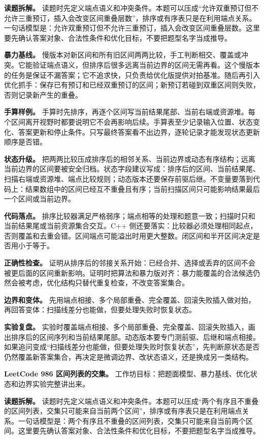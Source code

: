 \textbf{读题拆解。} 读题时先定义端点语义和冲突条件。本题可以压成“允许双重预订但不允许三重预订，插入会改变区间重叠层数”，排序或有序表只是在利用端点关系。一句话模型是：允许双重预订但不允许三重预订，插入会改变区间重叠层数。这里要先确认答案对象、合法性条件和优化目标，不要把题型名字当成推导。

\textbf{暴力基线。} 慢版本对新区间和所有旧区间两两比较，手工判断相交、覆盖或冲突。它能验证端点语义，但排序后很多远离当前边界的区间无需再看。这个慢版本的任务是保证不漏答案；它不追求快，只负责给优化版提供对拍基准。随后再引入优化抓手：保存已有预订和已经双重预订的区间；新预订若碰到双重区间则失败，否则记录新产生的重叠。

\textbf{手算样例。} 手算时先排序，再逐个区间写当前结果尾部、当前右端或资源堆。每个区间离开视野时都要说明它不会再影响后续。手算表至少记录输入位置、状态变化、答案更新和停止条件。只写最终答案看不出边界，逐轮记录才能发现状态更新顺序是否错。

\textbf{状态升级。} 把两两比较压成排序后的相邻关系、当前边界或动态有序结构；远离当前边界的区间要被安全归档。状态字段建议写成：排序后的区间、当前结果尾、扫描右端或资源堆、端点比较规则；动态版本还要保存前驱后继。不变量要落到代码上：结果数组中的区间已经互不重叠且有序；当前扫描区间只可能影响结果最后一个区间或当前边界。

\textbf{代码落点。} 排序比较器满足严格弱序；端点相等的处理和题意一致；扫描时只和当前结果尾或当前资源集合交互。C++ 侧还要落实：比较器必须处理相同起点，否则覆盖和去重会错。区间端点可能溢出时用更大整数。闭区间和半开区间决定是否用小于等于。

\textbf{正确性检查。} 证明从排序后的邻接关系开始：已经合并、选择或丢弃的区间不会被更后面的区间重新影响。证明时把算法和暴力版对齐：暴力能覆盖的合法候选仍然会被考虑，优化结构只替代重复检查，不改变答案集合。

\textbf{边界和变体。} 先用端点相接、多个局部重叠、完全覆盖、回滚失败插入做对拍，再回答变体：扫描线差分也能做，但要处理失败时恢复状态。

\textbf{实验复盘。} 实验时覆盖端点相接、多个局部重叠、完全覆盖、回滚失败插入，画出排序后的区间序列和当前结果尾部。动态版本要专门测前驱、后继和端点相接。如果追问变成“扫描线差分也能做，但要处理失败时恢复状态”，先判断原状态是否仍然覆盖新答案集合，再决定是微调边界、改状态语义，还是换成另一类结构。

\noindent\textbf{LeetCode 986 区间列表的交集。} 工作坊目标：把题面模型、暴力基线、优化状态和边界实验完整讲出来。

\textbf{读题拆解。} 读题时先定义端点语义和冲突条件。本题可以压成“两个有序且不重叠的区间列表，交集只可能来自当前两个区间”，排序或有序表只是在利用端点关系。一句话模型是：两个有序且不重叠的区间列表，交集只可能来自当前两个区间。这里要先确认答案对象、合法性条件和优化目标，不要把题型名字当成推导。


